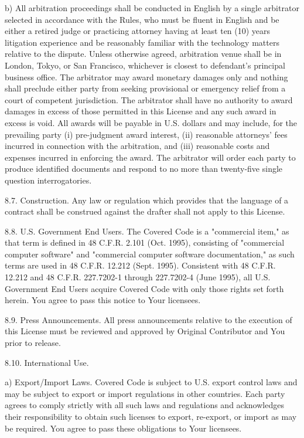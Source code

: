 {b) All arbitration proceedings shall be conducted in English by a
single arbitrator selected in accordance with the Rules, who must be
fluent in English and be either a retired judge or practicing attorney
having at least ten (10) years litigation experience and be reasonably
familiar with the technology matters relative to the dispute.  Unless
otherwise agreed, arbitration venue shall be in London, Tokyo, or San
Francisco, whichever is closest to defendant's principal business
office.  The arbitrator may award monetary damages only and nothing
shall preclude either party from seeking provisional or emergency
relief from a court of competent jurisdiction.  The arbitrator shall
have no authority to award damages in excess of those permitted in
this License and any such award in excess is void.  All awards will be
payable in U.S.  dollars and may include, for the prevailing party (i)
pre-judgment award interest, (ii) reasonable attorneys' fees incurred
in connection with the arbitration, and (iii) reasonable costs and
expenses incurred in enforcing the award.  The arbitrator will order
each party to produce identified documents and respond to no more than
twenty-five single question interrogatories.

8.7.  Construction.  Any law or regulation which provides that the
language of a contract shall be construed against the drafter shall
not apply to this License.

8.8.  U.S.  Government End Users.  The Covered Code is a "commercial
item," as that term is defined in 48 C.F.R. 2.101 (Oct.  1995),
consisting of "commercial computer software" and "commercial computer
software documentation," as such terms are used in 48 C.F.R.  12.212
(Sept.  1995).  Consistent with 48 C.F.R.  12.212 and 48 C.F.R.
227.7202-1 through 227.7202-4 (June 1995), all U.S.  Government End
Users acquire Covered Code with only those rights set forth herein.
You agree to pass this notice to Your licensees.

8.9.  Press Announcements.  All press announcements relative to the
execution of this License must be reviewed and approved by Original
Contributor and You prior to release.

8.10.  International Use.

a) Export/Import Laws.  Covered Code is subject to U.S. export control
laws and may be subject to export or import regulations in other
countries.  Each party agrees to comply strictly with all such laws
and regulations and acknowledges their responsibility to obtain such
licenses to export, re-export, or import as may be required.  You
agree to pass these obligations to Your licensees.

}
